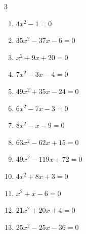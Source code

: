 \begin{multicols}{3}
\begin{enumerate}
  \item $4x^{2}-1=0$


  \item $35x^{2}-37x-6=0$


  \item $x^{2}+9x+20=0$

        \phantom{$\displaystyle x=-4,\; -5$}

  \item $7x^{2}-3x-4=0$


  \item $49x^{2}+35x-24=0$


  \item $6x^{2}-7x-3=0$


  \item $8x^{2}-x-9=0$


  \item $63x^{2}-62x+15=0$


\columnbreak %

\resetques

  \item $49x^{2}-119x+72=0$


  \item $4x^{2}+8x+3=0$


  \item $x^{2}+x-6=0$

        \phantom{$\displaystyle x=-3,\; 2$}

  \item $21x^{2}+20x+4=0$


  \item $25x^{2}-25x-36=0$


\end{enumerate}
\end{multicols}
